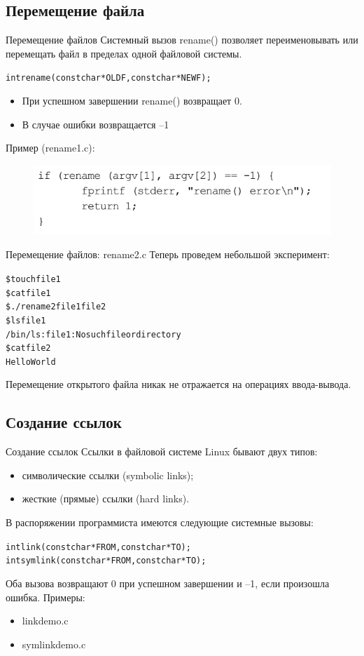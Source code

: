 \documentclass{beamer}
\begin{document}
\subsection{Перемещение файла}

\begin{frame}[fragile]{Перемещение файлов}
Системный вызов rename() позволяет переименовывать или перемещать файл в
пределах одной файловой системы.
\begin{alltt}
int rename (const char * OLDF, const char * NEWF);
\end{alltt}
\begin{itemize}
\item При успешном завершении rename() возвращает 0. 
\item В случае ошибки возвращается –1
\end{itemize}
Пример (rename1.c):
\begin{figure}[h]
\centering
\includegraphics[scale=0.6]{images/lec10-pic02.png}
\end{figure}
\end{frame}

\begin{frame}[fragile]{Перемещение файлов: rename2.c}
Теперь проведем небольшой эксперимент:
\begin{alltt}
\$ touch file1
\$ cat file1
\$ ./rename2 file1 file2
\$ ls file1
/bin/ls: file1: No such file or directory
\$ cat file2
Hello World
\end{alltt}
Перемещение открытого файла никак не отражается на операциях ввода-вывода.
\end{frame}

\subsection{Создание ссылок}

\begin{frame}[fragile]{Создание ссылок}
Ссылки в файловой системе Linux бывают двух типов:
\begin{itemize}
\item символические ссылки (symbolic links);
\item жесткие (прямые) ссылки (hard links).
\end{itemize}
В распоряжении программиста имеются следующие системные вызовы:
\begin{alltt}
int link (const char * FROM, const char * TO);
int symlink (const char * FROM, const char * TO);
\end{alltt}
Оба вызова возвращают 0 при успешном завершении и –1, если произошла ошибка.
Примеры: 
\begin{itemize}
\item linkdemo.c
\item symlinkdemo.c
\end{itemize}
\end{frame}
\end{document}
